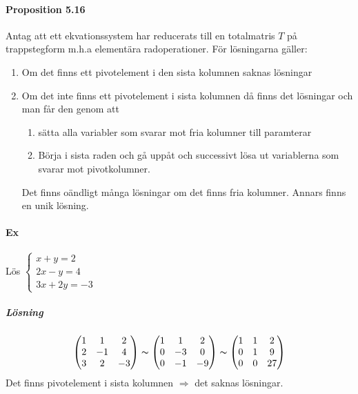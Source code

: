 \paragraph{Proposition 5.16} Antag att ett ekvationssystem har reducerats till en totalmatris $T$ på trappstegform m.h.a elementära radoperationer.
För lösningarna gäller:
\begin{enumerate}
    \item Om det finns ett pivotelement i den sista kolumnen saknas lösningar
    \item Om det inte finns ett pivotelement i sista kolumnen då finns det lösningar och man får den genom att
        \begin{enumerate}
            \item sätta alla variabler som svarar mot fria kolumner till paramterar
            \item Börja i sista raden och gå uppåt och successivt lösa ut variablerna som svarar mot pivotkolumner.
        \end{enumerate}
        Det finns oändligt många lösningar om det finns fria kolumner. Annars finns en unik lösning.
\end{enumerate}

\paragraph{Ex} Lös $\begin{cases}
    x+y=2\\
    2x-y=4\\
    3x+2y=-3
\end{cases}$
\subparagraph{Lösning} 
\begin{equation*}
    \begin{pmatrix}
        1&1&2\\
        2&-1&4\\
        3&2&-3
    \end{pmatrix}
    \thicksim
    \begin{pmatrix}
        1&1&2\\
        0&-3&0\\
        0&-1&-9
    \end{pmatrix}
    \thicksim
    \begin{pmatrix}
        1&1&2\\
        0&1&9\\
        0&0&27
    \end{pmatrix}
\end{equation*}
Det finns pivotelement i sista kolumnen $\Rightarrow$ det saknas lösningar.

